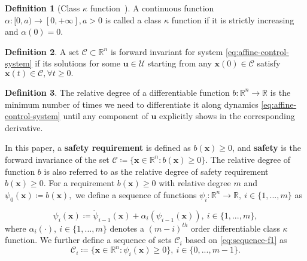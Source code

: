 \documentclass[letterpaper, 10 pt, conference]{ieeeconf}
\theoremstyle{definition}
\newtheorem{definition}{Definition}
\begin{document}
\begin{definition}[Class $\kappa$ function~\cite{Khalil:1173048}]
\label{def:class-k-f}
A continuous function $\alpha:[0,a)\to[0,+\infty],a>0$ is called a class $\kappa$ function if it is strictly increasing and $\alpha(0)=0.$
\end{definition}

\begin{definition}
\label{def:forward-inv}
A set $\mathcal C\subset \mathbb{R}^{n}$ is forward invariant for system \eqref{eq:affine-control-system} if its solutions for some $\boldsymbol{u} \in \mathcal U$ starting from any $\boldsymbol{x}(0) \in \mathcal C$ satisfy $\boldsymbol{x}(t) \in \mathcal C, \forall t \ge 0.$
\end{definition}

\begin{definition}
\label{def:relative-degree}
The relative degree of a differentiable function $b:\mathbb{R}^{n}\to\mathbb{R}$ is the minimum number of times we need to differentiate it along dynamics \eqref{eq:affine-control-system} until any component of $\boldsymbol{u}$ explicitly shows in the corresponding derivative. 
\end{definition}

In this paper,  a \textbf{safety requirement} is defined as $b(\boldsymbol{x})\ge0$, and \textbf{safety} is the forward invariance of the set $\mathcal C\coloneqq \{\boldsymbol{x}\in\mathbb{R}^{n}:b(\boldsymbol{x})\ge 0\}$. The relative degree of function $b$ is also referred to as the relative degree of safety requirement $b(\boldsymbol{x}) \ge 0$. For a requirement $b(\boldsymbol{x})\ge0$ with relative degree $m$ and $\psi_{0}(\boldsymbol{x})\coloneqq b(\boldsymbol{x}),$ we define a sequence of functions $\psi_{i}:\mathbb{R}^{n}\to\mathbb{R},\ i\in \{1,...,m\}$ as

\begin{equation}
\label{eq:sequence-f1}
\psi_{i}(\boldsymbol{x})\coloneqq\dot{\psi}_{i-1}(\boldsymbol{x})+\alpha_{i}(\psi_{i-1}(\boldsymbol{x})),\ i\in \{1,...,m\}, 
\end{equation}
where $\alpha_{i}(\cdot ),\ i\in \{1,...,m\}$ denotes a $(m-i)^{th}$ order differentiable class $\kappa$ function. We further define a sequence of sets $\mathcal C_{i}$ based on \eqref{eq:sequence-f1} as
\begin{equation}
\label{eq:sequence-set1}
\mathcal C_{i}\coloneqq \{\boldsymbol{x}\in\mathbb{R}^{n}:\psi_{i}(\boldsymbol{x})\ge 0\}, \ i\in \{0,...,m-1\}. 
\end{equation}
\end{document}
